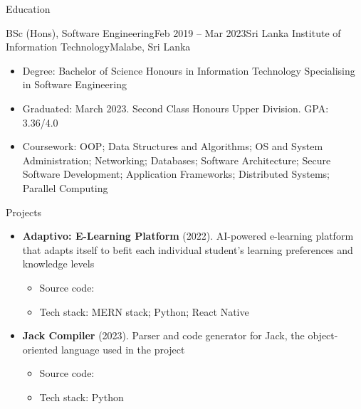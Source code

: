 \documentclass[garamond, a4paper]{modest-cv}
\begin{document}
	\begin{cvsection}{Education}
		\begin{cvsubsection}[2]{BSc (Hons), Software Engineering}{Feb 2019 -- Mar 2023}{Sri Lanka Institute of Information Technology}{Malabe, Sri Lanka}
			\begin{itemize}
				\item Degree: Bachelor of Science Honours in Information Technology Specialising in Software Engineering
				\item Graduated: March 2023. Second Class Honours Upper Division. GPA: 3.36/4.0
				\item Coursework: OOP; Data Structures and Algorithms; OS and System Administration; Networking; Databases; Software Architecture; Secure Software Development; Application Frameworks; Distributed Systems; Parallel Computing
			\end{itemize}
		\end{cvsubsection}
	\end{cvsection}

	\begin{cvsection}{Projects}
		\begin{cvsubsection}{}{}{}{}
			\begin{itemize}
				\item \textbf{Adaptivo: E-Learning Platform} (2022). AI-powered e-learning platform that adapts itself to befit each individual student's learning preferences and knowledge levels
				\begin{itemize}
					\item Source code: \small {}
					\item Tech stack: MERN stack; Python; React Native
				\end{itemize}
				
				\item \textbf{Jack Compiler} (2023). Parser and code generator for Jack, the object-oriented language used in the  project
				\begin{itemize}
					\item Source code: \small {}
					\item Tech stack: Python
				\end{itemize}
			\end{itemize}
		\end{cvsubsection}
	\end{cvsection}
\end{document}
